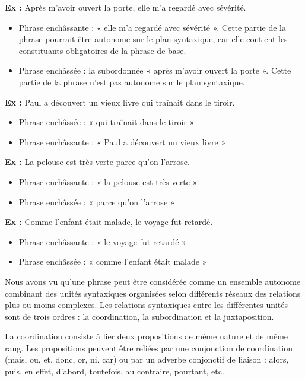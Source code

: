 \noindent\textbf{Ex :} Après m’avoir ouvert la porte, elle m’a regardé avec sévérité.
\begin{itemize}
\item Phrase enchâssante : « elle m’a regardé avec sévérité ». Cette partie de la phrase pourrait être autonome sur le plan syntaxique, car elle contient les constituants obligatoires de la phrase de base.
\item Phrase enchâssée : la subordonnée « après m’avoir ouvert la porte ». Cette partie de la phrase n’est pas autonome sur le plan syntaxique.
\end{itemize}
\noindent\textbf{Ex :} Paul a découvert un vieux livre qui traînait dans le tiroir.
\begin{itemize}
\item Phrase enchâssée : « qui traînait dans le tiroir »
\item Phrase enchâssante : « Paul a découvert un vieux livre »
\end{itemize}
\noindent\textbf{Ex :} La pelouse est très verte parce qu’on l’arrose.
\begin{itemize}
\item Phrase enchâssante : « la pelouse est très verte »
\item Phrase enchâssée : « parce qu’on l’arrose »
\end{itemize}
\noindent\textbf{Ex :} Comme l’enfant était malade, le voyage fut retardé.
\begin{itemize}
\item Phrase enchâssante : « le voyage fut retardé »
\item Phrase enchâssée : « comme l’enfant était malade »
\end{itemize}

Nous avons vu qu’une phrase peut être considérée comme un ensemble autonome combinant des unités syntaxiques organisées selon différents réseaux des relations plus ou moins complexes. Les relations syntaxiques entre les différentes unités sont de trois ordres : la coordination, la subordination et la juxtaposition.

La coordination consiste à lier deux propositions de même nature et de même rang. Les propositions peuvent être reliées par une conjonction de coordination (mais, ou, et, donc, or, ni, car) ou par un adverbe conjonctif de liaison : alors, puis, en effet, d’abord, toutefois, au contraire, pourtant, etc.

